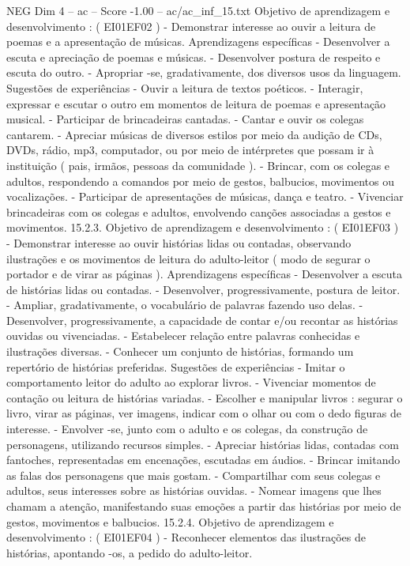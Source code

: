 \begin{textsample}{NEG Dim 4 – ac – Score -1.00 – ac/ac\_inf\_15.txt}
Objetivo de aprendizagem e desenvolvimento : ( EI01EF02 ) - Demonstrar interesse ao ouvir a leitura de poemas e a apresentação de músicas.
Aprendizagens específicas - Desenvolver a escuta e apreciação de poemas e músicas. - Desenvolver postura de respeito e escuta do outro. - Apropriar -se, gradativamente, dos diversos usos da linguagem.
Sugestões de experiências - Ouvir a leitura de textos poéticos. - Interagir, expressar e escutar o outro em momentos de leitura de poemas e apresentação musical. - Participar de brincadeiras cantadas. - Cantar e ouvir os colegas cantarem. - Apreciar músicas de diversos estilos por meio da audição de CDs, DVDs, rádio, mp3, computador, ou por meio de intérpretes que possam ir à instituição ( pais, irmãos, pessoas da comunidade ). - Brincar, com os colegas e adultos, respondendo a comandos por meio de gestos, balbucios, movimentos ou vocalizações. - Participar de apresentações de músicas, dança e teatro. - Vivenciar brincadeiras com os colegas e adultos, envolvendo canções associadas a gestos e movimentos. 15.2.3.
Objetivo de aprendizagem e desenvolvimento : ( EI01EF03 ) - Demonstrar interesse ao ouvir histórias lidas ou contadas, observando ilustrações e os movimentos de leitura do adulto-leitor ( modo de segurar o portador e de virar as páginas ).
Aprendizagens específicas - Desenvolver a escuta de histórias lidas ou contadas. - Desenvolver, progressivamente, postura de leitor. - Ampliar, gradativamente, o vocabulário de palavras fazendo uso delas. - Desenvolver, progressivamente, a capacidade de contar e/ou recontar as histórias ouvidas ou vivenciadas. - Estabelecer relação entre palavras conhecidas e ilustrações diversas. - Conhecer um conjunto de histórias, formando um repertório de histórias preferidas.
Sugestões de experiências - Imitar o comportamento leitor do adulto ao explorar livros. - Vivenciar momentos de contação ou leitura de histórias variadas. - Escolher e manipular livros : segurar o livro, virar as páginas, ver imagens, indicar com o olhar ou com o dedo figuras de interesse. - Envolver -se, junto com o adulto e os colegas, da construção de personagens, utilizando recursos simples. - Apreciar histórias lidas, contadas com fantoches, representadas em encenações, escutadas em áudios. - Brincar imitando as falas dos personagens que mais gostam. - Compartilhar com seus colegas e adultos, seus interesses sobre as histórias ouvidas. - Nomear imagens que lhes chamam a atenção, manifestando suas emoções a partir das histórias por meio de gestos, movimentos e balbucios. 15.2.4.
Objetivo de aprendizagem e desenvolvimento : ( EI01EF04 ) - Reconhecer elementos das ilustrações de histórias, apontando -os, a pedido do adulto-leitor.

\end{textsample}
